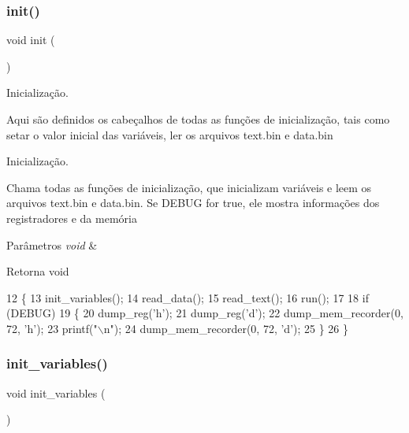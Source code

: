 \subsubsection{init()}
{\footnotesize\ttfamily void init (\begin{DoxyParamCaption}\item[{void}]{ }\end{DoxyParamCaption})}



Inicialização. 

Aqui são definidos os cabeçalhos de todas as funções de inicialização, tais como setar o valor inicial das variáveis, ler os arquivos text.\+bin e data.\+bin

Inicialização.

Chama todas as funções de inicialização, que inicializam variáveis e leem os arquivos text.\+bin e data.\+bin. Se D\+E\+B\+UG for true, ele mostra informações dos registradores e da memória 
\begin{DoxyParams}{Parâmetros}
{\em void} & \\
\hline
\end{DoxyParams}
\begin{DoxyReturn}{Retorna}
void 
\end{DoxyReturn}

\begin{DoxyCode}
12 \{
13     init_variables();
14     read_data();
15     read_text();
16     run();
17 
18     \textcolor{keywordflow}{if} (DEBUG)
19     \{
20         dump_reg(\textcolor{charliteral}{'h'});
21         dump_reg(\textcolor{charliteral}{'d'});
22         dump_mem_recorder(0, 72, \textcolor{charliteral}{'h'});
23         printf(\textcolor{stringliteral}{"\(\backslash\)n"});
24         dump_mem_recorder(0, 72, \textcolor{charliteral}{'d'});
25     \}
26 \}
\end{DoxyCode}
\mbox{\label{init_8h_a2977fbd2f72d5a8a5da608f804bd2a6f}} 
\subsubsection{init\+\_\+variables()}
{\footnotesize\ttfamily void init\+\_\+variables (\begin{DoxyParamCaption}\item[{void}]{ }\end{DoxyParamCaption})}



